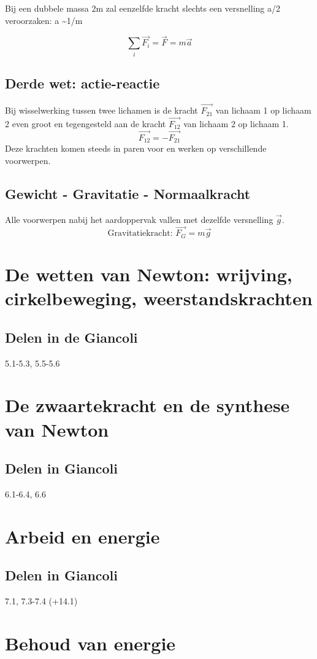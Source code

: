 \documentclass[12pt,a4paper]{article}
\begin{document}
	Bij een dubbele massa 2m zal eenzelfde kracht slechts een versnelling a/2 veroorzaken: a \textasciitilde 1/m 
	
	\[\sum_{i} \overrightarrow{F_i} = \overrightarrow{F} = m\overrightarrow{a}\]
	\subsection{Derde wet: actie-reactie}
	Bij wisselwerking tussen twee lichamen is de kracht \(\overrightarrow{F_{21}}\) van lichaam 1 op lichaam 2 even groot en tegengesteld aan de kracht \(\overrightarrow{F_{12}}\) van lichaam 2 op lichaam 1.
	\[\overrightarrow{F_{12}} = -\overrightarrow{F_{21}}\]
	Deze krachten komen steeds in paren voor en werken op verschillende voorwerpen.
	\subsection{Gewicht - Gravitatie - Normaalkracht}
	Alle voorwerpen nabij het aardoppervak vallen met dezelfde versnelling $\overrightarrow{g}$. 
	\[\text{Gravitatiekracht: } \overrightarrow{F_G} = m\overrightarrow{g}\]	
	\section{De wetten van Newton: wrijving, cirkelbeweging, weerstandskrachten}
	\subsection{Delen in de Giancoli}
	5.1-5.3, 5.5-5.6
	\section{De zwaartekracht en de synthese van Newton}
	\subsection{Delen in Giancoli}
	6.1-6.4, 6.6
	\section{Arbeid en energie}
	\subsection{Delen in Giancoli}
	7.1, 7.3-7.4 (+14.1)
	\section{Behoud van energie}
\end{document}
